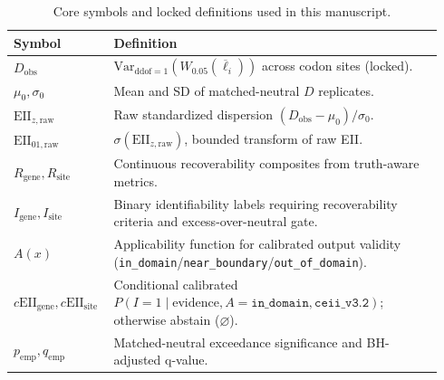 \documentclass[11pt]{article}
\begin{document}
\begin{table}[t]
\centering
\caption{Core symbols and locked definitions used in this manuscript.}
\begin{tabular}{p{0.20\linewidth} p{0.74\linewidth}}
\hline
Symbol & Definition \\
\hline
$D_{\mathrm{obs}}$ & $\mathrm{Var}_{\mathrm{ddof}=1}(W_{0.05}(\overline{\ell}_i))$ across codon sites (locked). \\
$\mu_0,\sigma_0$ & Mean and SD of matched-neutral $D$ replicates. \\
$\mathrm{EII}_{z,\mathrm{raw}}$ & Raw standardized dispersion $(D_{\mathrm{obs}}-\mu_0)/\sigma_0$. \\
$\mathrm{EII}_{01,\mathrm{raw}}$ & $\sigma(\mathrm{EII}_{z,\mathrm{raw}})$, bounded transform of raw EII. \\
$R_{\mathrm{gene}},R_{\mathrm{site}}$ & Continuous recoverability composites from truth-aware metrics. \\
$I_{\mathrm{gene}},I_{\mathrm{site}}$ & Binary identifiability labels requiring recoverability criteria and excess-over-neutral gate. \\
$A(x)$ & Applicability function for calibrated output validity (\texttt{in\_domain}/\texttt{near\_boundary}/\texttt{out\_of\_domain}). \\
$c\mathrm{EII}_{\mathrm{gene}},c\mathrm{EII}_{\mathrm{site}}$ & Conditional calibrated $P(I=1\mid\text{evidence},A=\texttt{in\_domain},\texttt{ceii\_v3.2})$; otherwise abstain ($\varnothing$). \\
$p_{\mathrm{emp}},q_{\mathrm{emp}}$ & Matched-neutral exceedance significance and BH-adjusted q-value. \\
\hline
\end{tabular}
\end{table}
\end{document}
